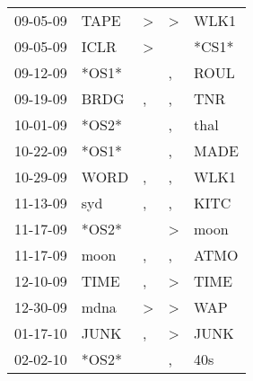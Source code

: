 \begin{supertabular}{p{0.07\textwidth}p{0.06\textwidth}p{0.02\textwidth}p{0.02\textwidth}p{0.06\textwidth}}
          09-05-09\textsuperscript{} &           TAPE\textsuperscript{} &     \textgreater &     \textgreater &           WLK1\textsuperscript{} \\
          09-05-09\textsuperscript{} &           ICLR\textsuperscript{} &     \textgreater &                  &                            *CS1* \\
          09-12-09\textsuperscript{} &                            *OS1* &                  &                , &           ROUL\textsuperscript{} \\
          09-19-09\textsuperscript{} &           BRDG\textsuperscript{} &                , &                , &            TNR\textsuperscript{} \\
          10-01-09\textsuperscript{} &                            *OS2* &                  &                , &           thal\textsuperscript{} \\
          10-22-09\textsuperscript{} &                            *OS1* &                  &                , &           MADE\textsuperscript{} \\
          10-29-09\textsuperscript{} &           WORD\textsuperscript{} &                , &                , &           WLK1\textsuperscript{} \\
          11-13-09\textsuperscript{} &            syd\textsuperscript{} &                , &                , &           KITC\textsuperscript{} \\
          11-17-09\textsuperscript{} &                            *OS2* &                  &     \textgreater &           moon\textsuperscript{} \\
          11-17-09\textsuperscript{} &           moon\textsuperscript{} &                , &                , &           ATMO\textsuperscript{} \\
          12-10-09\textsuperscript{} &           TIME\textsuperscript{} &                , &     \textgreater &           TIME\textsuperscript{} \\
          12-30-09\textsuperscript{} &           mdna\textsuperscript{} &     \textgreater &     \textgreater &            WAP\textsuperscript{} \\
          01-17-10\textsuperscript{} &           JUNK\textsuperscript{} &                , &     \textgreater &           JUNK\textsuperscript{} \\
          02-02-10\textsuperscript{} &                            *OS2* &                  &                , &            40s\textsuperscript{} \\

\end{supertabular}
